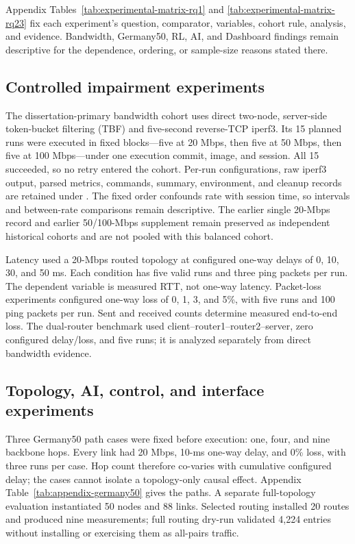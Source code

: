 Appendix Tables~\ref{tab:experimental-matrix-rq1} and \ref{tab:experimental-matrix-rq23} fix each experiment's question, comparator, variables, cohort rule, analysis, and evidence. Bandwidth, Germany50, RL, AI, and Dashboard findings remain descriptive for the dependence, ordering, or sample-size reasons stated there.

\subsection{Controlled impairment experiments}

The dissertation-primary bandwidth cohort uses direct two-node, server-side token-bucket filtering (TBF) and five-second reverse-TCP iperf3. Its 15 planned runs were executed in fixed blocks---five at 20 Mbps, then five at 50 Mbps, then five at 100 Mbps---under one execution commit, image, and session. All 15 succeeded, so no retry entered the cohort. Per-run configurations, raw iperf3 output, parsed metrics, commands, summary, environment, and cleanup records are retained under . The fixed order confounds rate with session time, so intervals and between-rate comparisons remain descriptive. The earlier single 20-Mbps record and earlier 50/100-Mbps supplement remain preserved as independent historical cohorts and are not pooled with this balanced cohort.

Latency used a 20-Mbps routed topology at configured one-way delays of 0, 10, 30, and 50 ms. Each condition has five valid runs and three ping packets per run. The dependent variable is measured RTT, not one-way latency. Packet-loss experiments configured one-way loss of 0, 1, 3, and 5\%, with five runs and 100 ping packets per run. Sent and received counts determine measured end-to-end loss. The dual-router benchmark used client--router1--router2--server, zero configured delay/loss, and five runs; it is analyzed separately from direct bandwidth evidence.

\subsection{Topology, AI, control, and interface experiments}

Three Germany50 path cases were fixed before execution: one, four, and nine backbone hops. Every link had 20 Mbps, 10-ms one-way delay, and 0\% loss, with three runs per case. Hop count therefore co-varies with cumulative configured delay; the cases cannot isolate a topology-only causal effect. Appendix Table~\ref{tab:appendix-germany50} gives the paths. A separate full-topology evaluation instantiated 50 nodes and 88 links. Selected routing installed 20 routes and produced nine measurements; full routing dry-run validated 4,224 entries without installing or exercising them as all-pairs traffic.


